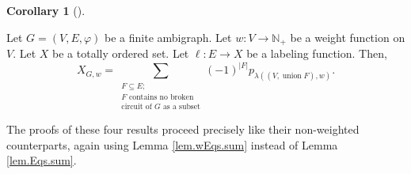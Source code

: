 \documentclass[numbers=enddot,12pt,final,onecolumn,notitlepage]{scrartcl}%
\theoremstyle{definition}
\newtheorem{coro}[theo]{Corollary}
\newenvironment{corollary}[1][]
{\begin{coro}[#1]\begin{leftbar}}
{\end{leftbar}\end{coro}}
\newenvironment{vershort}{}{}
\let\sumnonlimits\sum
\renewcommand{\sum}{\sumnonlimits\limits}
\begin{document}
\begin{corollary}
\label{cor.wambichromsym.NBC}Let $G=\left(  V,E,\varphi\right)  $ be a finite
ambigraph. Let $w:V\rightarrow\mathbb{N}_{+}$ be a weight function on $V$. Let
$X$ be a totally ordered set. Let $\ell:E\rightarrow X$ be a labeling
function. Then,%
\[
X_{G,w}=\sum_{\substack{F\subseteq E;\\F\text{ contains no broken}%
\\\text{circuit of }G\text{ as a subset}}}\left(  -1\right)  ^{\left\vert
F\right\vert }p_{\lambda\left(  \left(  V,\operatorname*{union}F\right)
,w\right)  }.
\]

\end{corollary}

\begin{vershort}
The proofs of these four results proceed precisely like their non-weighted
counterparts, again using Lemma \ref{lem.wEqs.sum} instead of Lemma
\ref{lem.Eqs.sum}.
\end{vershort}
\end{document}
